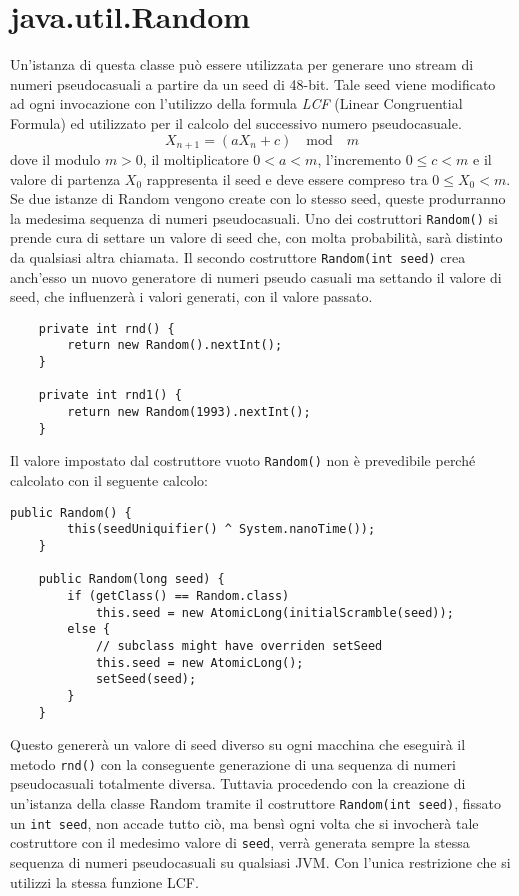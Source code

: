 	\section{java.util.Random}
	\label{java.util.random}
		Un'istanza di questa classe può essere utilizzata per generare uno stream di numeri pseudocasuali a partire da un seed di 48-bit. Tale seed viene modificato ad ogni invocazione con l'utilizzo della formula \textit{LCF} (Linear Congruential Formula) ed utilizzato per il calcolo del successivo numero pseudocasuale. 
		\[ X_{n+1} = (aX_n + c) \quad \text{mod} \quad m\]
		dove il modulo $m > 0$, il moltiplicatore $0 < a < m$, l'incremento $0 \leq c < m$ e il valore di partenza $X_0$ rappresenta il seed e deve essere compreso tra $0 \leq X_0 < m$.
		Se due istanze di Random vengono create con lo stesso seed, queste produrranno la medesima sequenza di numeri pseudocasuali. Uno dei costruttori \lstinline|Random()| si prende cura di settare un valore di seed che, con molta probabilità, sarà distinto da qualsiasi altra chiamata. Il secondo costruttore \lstinline|Random(int seed)| crea anch'esso un nuovo generatore di numeri pseudo casuali ma settando il valore di seed, che influenzerà i valori generati, con il valore passato. 
		\begin{lstlisting}
	private int rnd() {
		return new Random().nextInt(); 
	}
	
	private int rnd1() {
		return new Random(1993).nextInt(); 
	}  
		\end{lstlisting}
		Il valore impostato dal costruttore vuoto \lstinline|Random()| non è prevedibile perché calcolato con il seguente calcolo:
		\begin{lstlisting}[numbers=none,frame=none]
	public Random() {
		this(seedUniquifier() ^ System.nanoTime());
	}
	
	public Random(long seed) {
		if (getClass() == Random.class)
			this.seed = new AtomicLong(initialScramble(seed));
		else {
			// subclass might have overriden setSeed
			this.seed = new AtomicLong();
			setSeed(seed);
		}
	}
		\end{lstlisting}
		Questo genererà un valore di seed diverso su ogni macchina che eseguirà il metodo \lstinline|rnd()| con la conseguente generazione di una sequenza di numeri pseudocasuali totalmente diversa. Tuttavia procedendo con la creazione di un'istanza della classe Random tramite il costruttore \lstinline|Random(int seed)|, fissato un \lstinline|int seed|, non accade tutto ciò, ma bensì ogni volta che si invocherà tale costruttore con il medesimo valore di \lstinline|seed|, verrà generata sempre la stessa sequenza di numeri pseudocasuali su qualsiasi JVM. Con l'unica restrizione che si utilizzi la stessa funzione LCF. 
